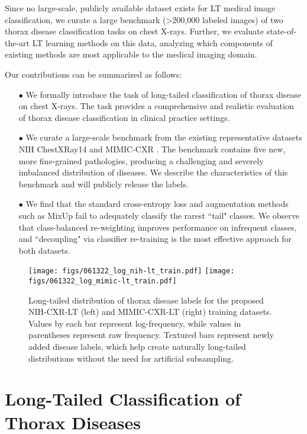 \documentclass[runningheads]{llncs}
\begin{document}
Since no large-scale, publicly available dataset exists for LT medical image classification, we curate a large benchmark (\textgreater 200,000 labeled images) of two thorax disease classification tasks on chest X-rays. Further, we evaluate state-of-the-art LT learning methods on this data, analyzing which components of existing methods are most applicable to the medical imaging domain.

Our contributions can be summarized as follows:
\begin{itemize}[topsep=1pt, leftmargin=1.25cm]
    \item[$\bullet$] We formally introduce the task of long-tailed classification of thorax disease on chest X-rays. The task provides a comprehensive and realistic evaluation of thorax disease classification in clinical practice settings.
    \item[$\bullet$] We curate a large-scale benchmark from the existing representative datasets NIH ChestXRay14 \cite{wang2017learning} and MIMIC-CXR \cite{johnson2019mimic}. The benchmark contains five new, more fine-grained pathologies, producing a challenging and severely imbalanced distribution of diseases. We describe the characteristics of this benchmark and will publicly release the labels.
    \item[$\bullet$] We find that the standard cross-entropy loss and augmentation methods such as MixUp fail to adequately classify the rarest ``tail" classes. We observe that class-balanced re-weighting improves performance on infrequent classes, and ``decoupling" via classifier re-training is the most effective approach for both datasets.
\end{itemize}

\begin{figure}[!ht]
    \centering
    \texttt{[image: figs/061322\_log\_nih-lt\_train.pdf]}
    \texttt{[image: figs/061322\_log\_mimic-lt\_train.pdf]}
    \caption{Long-tailed distribution of thorax disease labels for the proposed NIH-CXR-LT (left) and MIMIC-CXR-LT (right) training datasets. Values by each bar represent log-frequency, while values in parentheses represent raw frequency. Textured bars represent newly added disease labels, which help create naturally long-tailed distributions without the need for artificial subsampling.}
    \label{fig:data}
\end{figure}


\section{Long-Tailed Classification of Thorax Diseases}
\raggedbottom
\end{document}
